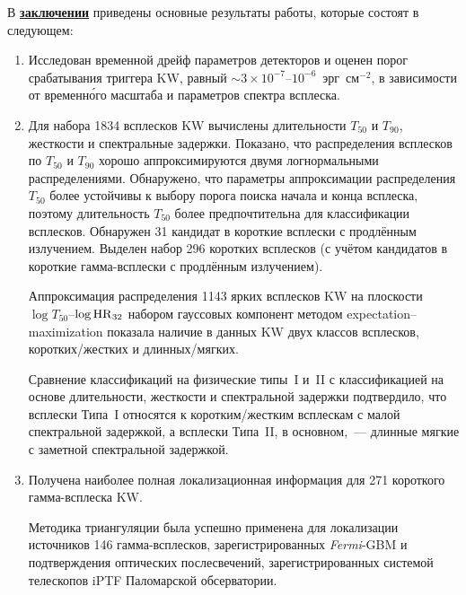 В \underline{\textbf{заключении}} приведены основные результаты работы, 
которые состоят в следующем:
\begin{enumerate}
 
\item Исследован временной дрейф параметров детекторов и оценен порог 
    срабатывания триггера KW, равный $\sim 3\times10^{-7}$--$10^{-6}$~эрг~см$^{-2}$,
    в зависимости от временн\'{о}го масштаба и параметров спектра всплеска. 
    
\item Для набора 1834 всплесков KW вычислены длительности $T_{50}$ и $T_{90}$, жесткости 
    и спектральные задержки. Показано, что распределения 
    всплесков по $T_{50}$ и $T_{90}$ хорошо аппроксимируются двумя логнормальными 
    распределениями. Обнаружено, что параметры аппроксимации распределения $T_{50}$ 
    более устойчивы к выбору порога поиска начала и конца всплеска, поэтому длительность 
    $T_{50}$ более предпочтительна для классификации всплесков. 
    Обнаружен 31 кандидат в короткие всплески с продлённым излучением.
    Выделен набор 296 коротких всплесков (с учётом кандидатов 
    в короткие гамма-всплески с продлённым излучением). 
      
    Аппроксимация распределения 1143 ярких всплесков KW на плоскости $\log T_{50}$--$\log {\mathrm{HR}}_{32}$ 
    набором гауссовых компонент методом expectation–maximization показала наличие 
    в данных KW двух классов всплесков, коротких/жестких и длинных/мягких. 

    Сравнение классификаций на физические типы~I и~II с классификацией на основе 
    длительности, жесткости и спектральной задержки подтвердило, что всплески Типа~I 
    относятся к коротким/жестким всплескам с малой спектральной задержкой, а всплески 
    Типа~II, в основном,~--- длинные мягкие с заметной спектральной задержкой. 
    
\item Получена наиболее полная локализационная информация для 271 короткого 
    гамма-всплеска KW. 
    
    Методика триангуляции была успешно применена для 
    локализации источников 146 гамма-всплесков, зарегистрированных \textit{Fermi}-GBM и
    подтверждения оптических послесвечений, зарегистрированных системой телескопов 
    iPTF Паломарской обсерватории.
    

\end{enumerate}
